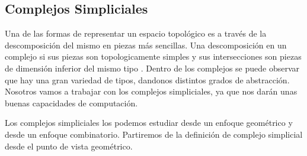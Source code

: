 \subsection{Complejos Simpliciales}
Una de las formas de representar un espacio topológico es a través de la descomposición del mismo en piezas más sencillas. Una descomposición en un complejo si sus piezas son topologicamente simples y sus intersecciones son piezas de dimensión inferior del mismo tipo \cite{EH}. Dentro de los complejos se puede observar que hay una gran variedad de tipos, dandonos distintos grados de abstracción. Nosotros vamos a trabajar con los complejos simpliciales, ya que nos darán unas buenas capacidades de computación.

Los complejos simpliciales los podemos estudiar desde un enfoque geométrico y desde un enfoque combinatorio. Partiremos de la definición de complejo simplicial desde el punto de vista geométrico.

















